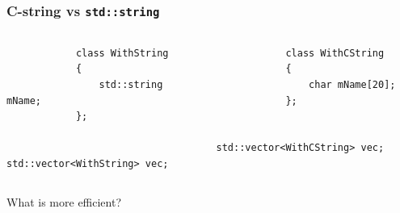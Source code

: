 \documentclass{beamer}
\begin{document}
\begin{frame}[fragile]
\frametitle{C-string vs \texttt{std::string}}
    \begin{columns}[T]
        \begin{lstlisting}
            class WithString
            {
                std::string mName;
            };

            std::vector<WithString> vec;
        \end{lstlisting}
        \begin{lstlisting}
            class WithCString
            {
                char mName[20];
            };

            std::vector<WithCString> vec;
        \end{lstlisting}
    \end{columns}

    \pause
    \begin{center}
        What is more efficient?
    \end{center}
\end{frame}
\end{document}
